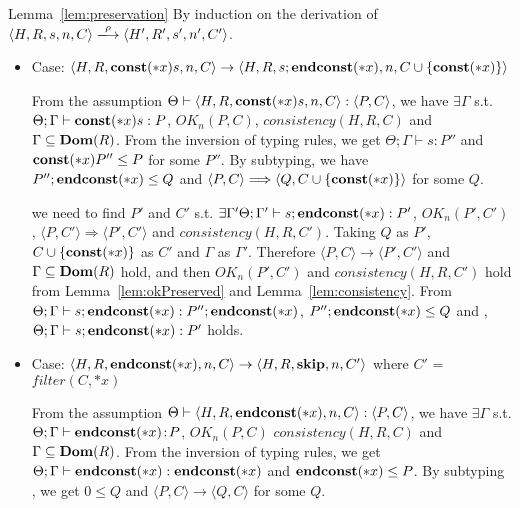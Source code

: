 \begin{pfof}{Lemma~\ref{lem:preservation}}
By induction on the derivation of \(\langle H, R, s, n, C \rangle
\xlongrightarrow{\rho} \langle H' ,R' ,s', n', C' \rangle\).

\begin{itemize}

\item Case: \( \langle H, R, \mathbf{const}(*x) s, n, C \rangle
  \rightarrow \langle H, R, s;\mathbf{endconst}(*x), n, C\cup
  \{\mathbf{const}(*x)\} \rangle \)

  From the assumption \( \Theta \vdash \langle H, R, \mathbf{const}(*x) s, n,
  C \rangle : \langle P, C \rangle\), we have \( \exists \Gamma\) s.t.
  \(\Theta; \Gamma \vdash \mathbf{const}(*x) s: P \), \( OK_n(P, C) \),
  \(consistency(H, R, C)\) and \(\Gamma \subseteq \mathbf{Dom}(R)\). From the
  inversion of typing rules, we get \( \Theta; \Gamma \vdash s:P'' \)
  and \( \mathbf{const}(*x) P'' \le P \) for some \( P'' \). By subtyping, we
  have \( P'';\mathbf{endconst}(*x) \le Q \) and \( \langle P, C \rangle
  \Longrightarrow \langle Q, C\cup \{\mathbf{const}(*x)\} \rangle \) for some
  \( Q \).

  we need to find \(P'\) and \(C'\) s.t. \( \exists \Gamma' \Theta;
  \Gamma' \vdash s;\mathbf{endconst}(*x):P'\), \( OK_n(P', C')\), \( \langle P, C'
  \rangle \Longrightarrow \langle P', C' \rangle \) and
  \(consistency(H, R, C')\). Taking \( Q \) as \( P'\), \( C \cup
  \{\mathbf{const}(*x)\} \) as \(C'\) and \(\Gamma\) as \(\Gamma'\). Therefore \(
  \langle P, C \rangle \rightarrow \langle P', C' \rangle\) and
  \(\Gamma \subseteq \mathbf{Dom}(R)\) hold, and then \( OK_n(P', C')\) and
  \(consistency(H, R, C')\) hold from Lemma~\ref{lem:okPreserved} and
  Lemma~\ref{lem:consistency}. From \( \Theta; \Gamma \vdash
  s;\mathbf{endconst}(*x):P'';\mathbf{endconst}(*x) \), \( P'';\mathbf{endconst}(*x) \le Q \) and
  , \( \Theta; \Gamma \vdash s;\mathbf{endconst}(*x):P'\) holds.

\item Case: \( \langle H, R, \mathbf{endconst}(*x), n, C \rangle \rightarrow
  \langle H, R, \mathbf{skip}, n, C' \rangle \) where \(C'\) = \(filter(C,
  *x)\)

   From the assumption \( \Theta \vdash \langle H, R, \mathbf{endconst}(*x), n, C
   \rangle : \langle P, C \rangle\), we have \(\exists \Gamma\)
   s.t. \( \Theta; \Gamma \vdash \mathbf{endconst}(*x) \!:\! P\), \( OK_n(P, C) \)
   \(consistency(H, R, C)\) and \(\Gamma \subseteq \mathbf{Dom}(R)\). From the
   inversion of typing rules, we get \( \Theta; \Gamma \vdash
   \mathbf{endconst}(*x):\mathbf{endconst}(*x) \) and \( \mathbf{endconst}(*x) \le P \). By subtyping , we
   get \( 0 \le Q \) and \( \langle P, C \rangle \rightarrow \langle
   Q, C \rangle\) for some \( Q \).


\end{itemize}
\end{pfof}
